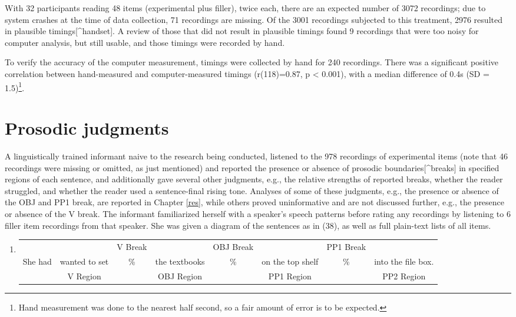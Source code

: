 \documentclass[11pt,oneside]{book}
\providecommand{\tightlist}{%
  \setlength{\itemsep}{0pt}\setlength{\parskip}{0pt}}
\let\rmarkdownfootnote\footnote%
\def\footnote{\protect\rmarkdownfootnote}
\begin{document}
With 32 participants reading 48 items (experimental plus filler), twice each, there are an expected number of 3072 recordings; due to system crashes at the time of data collection, 71 recordings are missing. Of the 3001 recordings subjected to this treatment, 2976 resulted in plausible timings{[}\^{}handset{]}. A review of those that did not result in plausible timings found 9 recordings that were too noisy for computer analysis, but still usable, and those timings were recorded by hand.

To verify the accuracy of the computer measurement, timings were collected by hand for 240 recordings. There was a significant positive correlation between hand-measured and computer-measured timings (r(118)=0.87, p \textless{} 0.001), with a median difference of 0.4s (SD = 1.5)\footnote{Hand measurement was done to the nearest half second, so a fair amount of error is to be expected.}.

\hypertarget{sita}{%
\section{Prosodic judgments}\label{sita}}

A linguistically trained informant naive to the research being conducted, listened to the 978 recordings of experimental items (note that 46 recordings were missing or omitted, as just mentioned) and reported the presence or absence of prosodic boundaries{[}\^{}breaks{]} in specified regions of each sentence, and additionally gave several other judgments, e.g., the relative strengths of reported breaks, whether the reader struggled, and whether the reader used a sentence-final rising tone. Analyses of some of these judgments, e.g., the presence or absence of the OBJ and PP1 break, are reported in Chapter \ref{res}, while others proved uninformative and are not discussed further, e.g., the presence or absence of the V break. The informant familiarized herself with a speaker's speech patterns before rating any recordings by listening to 6 filler item recordings from that speaker. She was given a diagram of the sentences as in (38), as well as full plain-text lists of all items.

\begin{enumerate}
\def\labelenumi{(\arabic{enumi})}
\setcounter{enumi}{37}
\tightlist
\item
  \begingroup
  \setlength{\tabcolsep}{1pt}

  \begin{tabular}{cccccccc}
    & & \footnotesize V Break & & \footnotesize OBJ Break & & \footnotesize PP1 Break & \\
    She had & wanted to set & \% & the textbooks & \% & on the top shelf & \% & into the file box. \\
    \cmidrule(r){2-2} \cmidrule(r){4-4} \cmidrule(r){6-6} \cmidrule(r){8-8} 
    & \footnotesize V Region & & \footnotesize OBJ Region & & \footnotesize PP1 Region & & PP2 Region \\
  \end{tabular}
    \endgroup
\end{enumerate}
\end{document}
